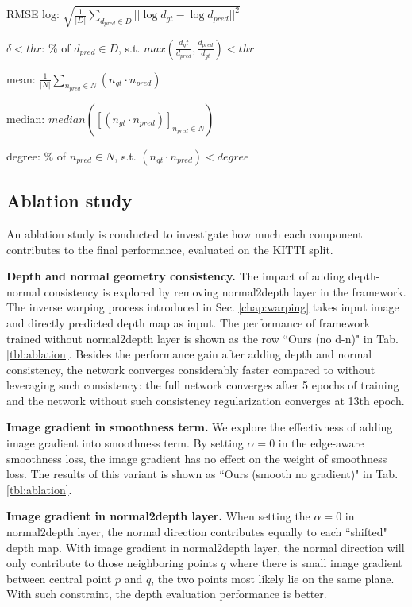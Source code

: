 RMSE log: $\sqrt{\frac{1}{|D|}\sum_{d_{pred}\in D}||\log d_{gt} - \log d_{pred}||^2}$

$\delta<thr$: $\%$ of $d_{pred}\in D$, s.t. $max(\frac{d_gt}{d_{pred}}, \frac{d_{pred}}{d_{gt}})<thr$

mean: $\frac{1}{|N|}\sum_{n_{pred}\in N}(n_{gt}\cdot n_{pred})$

median: $median([(n_{gt}\cdot n_{pred})]_{n_{pred} \in N})$

degree: $\%$ of $n_{pred} \in N$, s.t. $(n_{gt}\cdot n_{pred}) < degree$

\subsection{Ablation study}

An ablation study is conducted to investigate how much each component contributes to the final performance, evaluated on the KITTI split.

\textbf{Depth and normal geometry consistency.} The impact of adding depth-normal consistency is explored by removing normal2depth layer in the framework. The inverse warping process introduced in Sec. \ref{chap:warping} takes input image and directly predicted depth map as input. The performance of framework trained without normal2depth layer is shown as the row ``Ours (no d-n)" in Tab. \ref{tbl:ablation}. Besides the performance gain after adding depth and normal consistency, the network converges considerably faster compared to without leveraging such consistency: the full network converges after 5 epochs of training and the network without such consistency regularization converges at 13th epoch.

\textbf{Image gradient in smoothness term.} We explore the effectivness of adding image gradient into smoothness term. By setting $\alpha=0$ in the edge-aware smoothness loss, the image gradient has no effect on the weight of smoothness loss. The results of this variant is shown as ``Ours (smooth no gradient)" in Tab. \ref{tbl:ablation}.

\textbf{Image gradient in normal2depth layer.} When setting the $\alpha =0$ in normal2depth layer, the normal direction contributes equally to each ``shifted" depth map. With image gradient in normal2depth layer, the normal direction will only contribute to those neighboring points $q$ where there is small image gradient between central point $p$ and $q$, \ie the two points most likely lie on the same plane. With such constraint, the depth evaluation performance is better. 


